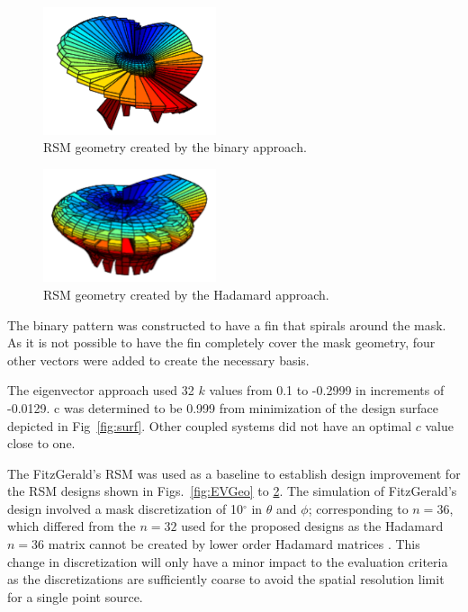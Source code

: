 \documentclass[3p,times]{elsarticle}
\begin{document}
\begin{figure}[ht!]
\includegraphics[width={2.0in}]{../figs/BiGeo.pdf}
\centering
\caption{RSM geometry created by the binary approach.}
\label{fig:BiGeo}

\end{figure}
\begin{figure}[ht!]
\centering
\includegraphics[width={2.0in}]{../figs/HadGeo.pdf}
\caption{RSM geometry created by the Hadamard approach.}
\label{fig:HadGeo}
\end{figure}

The binary pattern was constructed to have a fin that spirals around the mask.  
As it is not possible to have the fin completely cover the mask geometry, four other vectors were added to create the necessary basis.

The eigenvector approach used 32 $k$ values from 0.1 to -0.2999 in increments of -0.0129. 
c was determined to be 0.999 from minimization of the design surface depicted in Fig~\ref{fig:surf}.  
Other coupled systems did not have an optimal $c$ value close to one.

The FitzGerald's RSM was used as a baseline to establish design improvement for the RSM designs shown in Figs.~\ref{fig:EVGeo} to \ref{fig:HadGeo}.  
The simulation of FitzGerald's design involved a mask discretization of 10$^\circ$ in $\theta$ and $\phi$; corresponding to $n=36$, which differed from the $n=32$ used for the proposed designs  as the Hadamard $n=36$ matrix cannot be created by lower order Hadamard matrices \cite{Weisstein}. 
This change in discretization will only have a minor impact to the evaluation criteria as the discretizations are sufficiently coarse to avoid the spatial resolution limit for a single point source.
\end{document}
